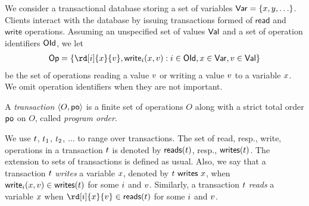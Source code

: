 We consider a transactional database storing a set of variables $\Var=\{\xvar,\yvar,\ldots\}$. Clients interact with the database by issuing transactions formed of $\textsf{read}$ and $\textsf{write}$ operations. Assuming an unspecified set of values $\Val$ and a set of operation identifiers $\OId$, we let 
\begin{align*}
 \Op=\set{\rd[\id]{\xvar}{\val},\wrt[\id]{\xvar}{\val}: \id\in\OId, \xvar\in\Var, \val\in \Val}
\end{align*} 
be the set of operations reading a value $\val$ or writing a value $\val$ to a variable $\xvar$. We omit operation identifiers when they are not important.

\begin{definition}
 A \emph{transaction} $\tup{O, \po}$ is a finite set of operations $O$ along with a strict total order $\po$ on $O$, called \emph{program order}.
\end{definition}

We use $\tr$, $\tr_1$, $\tr_2$, $\ldots$ to range over transactions. The set of read, resp., write, operations in a transaction $\tr$ is denoted by $\readOp{\tr}$, resp., $\writeOp{\tr}$. The extension to sets of transactions is defined as usual. Also, we say that a transaction $\tr$ \emph{writes} a variable $\xvar$, denoted by $\writeVar{\tr}{\xvar}$, when $\wrt[\id]{\xvar}{\val}\in \writeOp{\tr}$ for some $\id$ and $\val$. Similarly, a transaction $\tr$ \emph{reads} a variable $\xvar$ when $\rd[\id]{\xvar}{\val}\in \readOp{\tr}$ for some $\id$ and $\val$.

